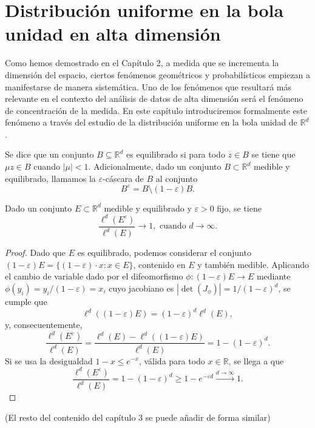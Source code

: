 \chapter{Distribución uniforme en la bola unidad en alta dimensión}

Como hemos demostrado en el Capítulo 2, a medida que se incrementa la dimensión del espacio, ciertos fenómenos geométricos y probabilísticos empiezan a manifestarse de manera sistemática. Uno de los fenómenos que resultará más relevante en el contexto del análisis de datos de alta dimensión será el fenómeno de concentración de la medida. En este capítulo introduciremos formalmente este fenómeno a través del estudio de la distribución uniforme en la bola unidad de $\mathbb{R}^d$.

\begin{definition}
Se dice que un conjunto $B \subseteq \mathbb{R}^d$ es equilibrado si para todo $z \in B$ se tiene que $\mu z \in B$ cuando $|\mu| < 1$. Adicionalmente, dado un conjunto $B \subset \mathbb{R}^d$ medible y equilibrado, llamamos la $\varepsilon$-cáscara de $B$ al conjunto
\[ B^\varepsilon = B \setminus (1 - \varepsilon)B. \]
\end{definition}

\begin{lemma}
Dado un conjunto $E \subset \mathbb{R}^d$ medible y equilibrado y $\varepsilon > 0$ fijo, se tiene
\[ \frac{\ell^d(E^\varepsilon)}{\ell^d(E)} \to 1, \text{ cuando } d \to \infty. \]
\end{lemma}

\begin{proof}
Dado que $E$ es equilibrado, podemos considerar el conjunto $(1 - \varepsilon)E = \{(1 - \varepsilon) \cdot x : x \in E\}$, contenido en $E$ y también medible. Aplicando el cambio de variable dado por el difeomorfismo $\phi : (1 - \varepsilon)E \to E$ mediante $\phi(y_i) = y_i / (1 - \varepsilon) = x_i$ cuyo jacobiano es $|\det(J_\phi)| = 1 / (1 - \varepsilon)^d$, se cumple que
\[ \ell^d((1 - \varepsilon)E) = (1 - \varepsilon)^d \ell^d(E), \]
y, consecuentemente,
\[ \frac{\ell^d(E^\varepsilon)}{\ell^d(E)} = \frac{\ell^d(E) - \ell^d((1 - \varepsilon)E)}{\ell^d(E)} = 1 - (1 - \varepsilon)^d. \]
Si se usa la desigualdad $1 - x \leq e^{-x}$, válida para todo $x \in \mathbb{R}$, se llega a que
\[ \frac{\ell^d(E^\varepsilon)}{\ell^d(E)} = 1 - (1 - \varepsilon)^d \geq 1 - e^{-\varepsilon d} \xrightarrow{d \to \infty} 1. \]
\end{proof}

(El resto del contenido del capítulo 3 se puede añadir de forma similar)
